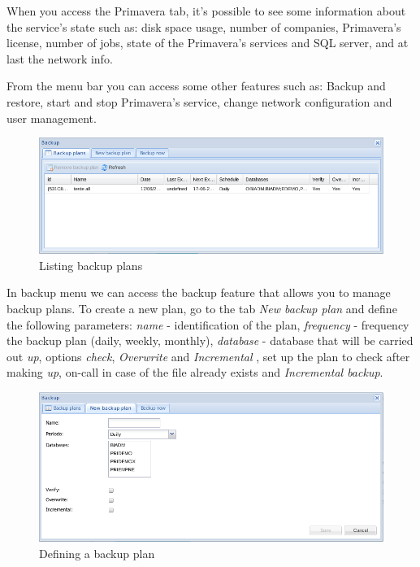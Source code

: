 When you access the Primavera tab, it's possible to see some information about the service's state such as: disk space usage, number of companies, Primavera's license, number of jobs, state of the Primavera's services and SQL server, and at last the network info.

From the menu bar you can access some other features such as: Backup and restore, start and stop Primavera's service, change network configuration and user management.

\begin{figure}[H]
    \begin{center}
    \includegraphics[scale=0.5]{screenshots/primavera/primaverainterface_02.png}
    \caption{Listing backup plans}
    \label{fig:primavera_list_backup_plans}
    \end{center}
\end{figure}

In backup menu we can access the backup feature that allows you to manage backup plans.
To create a new plan, go to the tab \textit{New backup plan} and define the following parameters: \textit{name} - identification of the plan, \textit{frequency} - frequency the backup plan (daily, weekly, monthly), \textit{database} - database that will be carried out \textit{up}, options \textit{check}, \textit{Overwrite} and \textit{Incremental} , set up the plan to check after making \textit{up}, on-call in case of the file already exists and \textit{Incremental backup}.

\begin{figure}[H]
    \begin{center}
    \includegraphics[scale=0.5]{screenshots/primavera/primaverainterface_03.png}
    \caption{Defining a backup plan}
    \label{fig:primavera_new_backup_plan}
    \end{center}
\end{figure}

